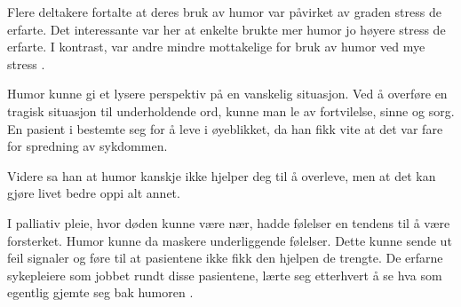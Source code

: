 Flere deltakere fortalte at deres bruk av humor var påvirket av graden stress
de erfarte. Det interessante var her at enkelte brukte mer humor jo høyere
stress de erfarte. I kontrast, var andre mindre mottakelige for bruk av humor
ved mye stress \cite{dean2005}.

Humor kunne gi et lysere perspektiv på en vanskelig situasjon. Ved å overføre
en tragisk situasjon til underholdende ord, kunne man le av fortvilelse, sinne
og sorg. En pasient i  bestemte seg for å leve i
øyeblikket, da han fikk vite at det var fare for spredning av sykdommen.


Videre sa han at humor kanskje ikke hjelper deg til å overleve, men at det kan
gjøre livet bedre oppi alt annet.

I palliativ pleie, hvor døden kunne være nær, hadde følelser en tendens til å
være forsterket. Humor kunne da maskere underliggende følelser. Dette kunne
sende ut feil signaler og føre til at pasientene ikke fikk den hjelpen de
trengte. De erfarne sykepleiere som jobbet rundt disse pasientene, lærte seg
etterhvert å se hva som egentlig gjemte seg bak humoren \cite{mccreaddie2011}.
